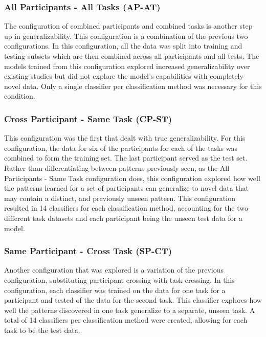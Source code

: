 \documentclass[11pt]{article}
\begin{document}
		\subsubsection{All Participants - All Tasks (AP-AT)}
		The configuration of combined participants and combined tasks is another step up in generalizability. This configuration is a combination of the previous two configurations. In this configuration, all the data was split into training and testing subsets which are then combined across all participants and all tests. The models trained from this configuration explored increased generalizability over existing studies but did not explore the model's capabilities with completely novel data. Only a single classifier per classification method was necessary for this condition.
		
		\subsubsection{Cross Participant - Same Task (CP-ST)}
		This configuration was the first that dealt with true generalizability. For this configuration, the data for six of the participants for each of the tasks was combined to form the training set. The last participant served as the test set. Rather than differentiating between patterns previously seen, as the All Participants - Same Task configuration does, this configuration explored how well the patterns learned for a set of participants can generalize to novel data that may contain a distinct, and previously unseen pattern. This configuration resulted in 14 classifiers for each classification method, accounting for the two different task datasets and each participant being the unseen test data for a model.
		
		\subsubsection{Same Participant - Cross Task (SP-CT)}
		Another configuration that was explored is a variation of the previous configuration, substituting participant crossing with task crossing. In this configuration, each classifier was trained on the data for one task for a participant and tested of the data for the second task. This classifier explores how well the patterns discovered in one task generalize to a separate, unseen task. A total of 14 classifiers per classification method were created, allowing for each task to be the test data.
		
\end{document}
